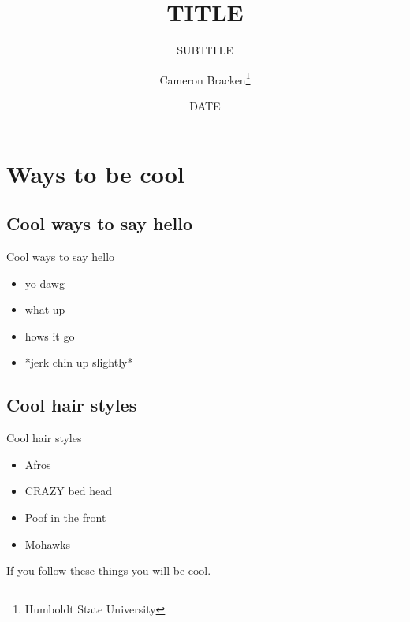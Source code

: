 \documentclass[compress]{beamer}
\title[TITLE]{TITLE}
\subtitle{SUBTITLE}
\author[Bracken]{Cameron Bracken\footnote{Humboldt State University}}
\date{DATE}
\begin{document}
\begin{frame}
\titlepage
\end{frame}

\section{Ways to be cool}

\subsection{Cool ways to say hello}
\begin{frame}{Cool ways to say hello}
	\begin{itemize}
		\item yo dawg
		\item what up 
		\item hows it go
		\item *jerk chin up slightly*
	\end{itemize}
\end{frame}

\subsection{Cool hair styles}
\begin{frame}{Cool hair styles}
	\begin{itemize}
		\item Afros
		\item CRAZY bed head
		\item Poof in the front 
		\item Mohawks
	\end{itemize}
	If you follow these things you will be cool.
\end{frame}
\end{document}
